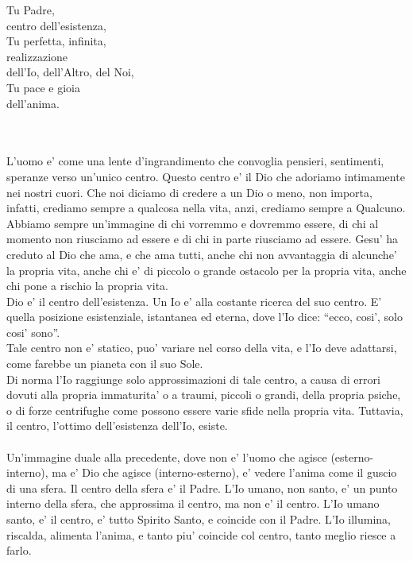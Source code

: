 \begin{vcentered}
\begin{poem}
Tu Padre,\\
centro dell'esistenza,\\
Tu perfetta, infinita, \\
    realizzazione\\
dell'Io, dell'Altro, del Noi,\\
Tu pace e gioia\\
dell'anima.\\
\end{poem}
\leavevmode\\
\leavevmode\\
L'uomo e' come una lente d'ingrandimento che convoglia pensieri, sentimenti, speranze verso un'unico centro. Questo centro e' il Dio che adoriamo intimamente nei nostri cuori. Che noi diciamo di credere a un Dio o meno, non importa, infatti, crediamo sempre a qualcosa nella vita, anzi, crediamo sempre a Qualcuno. Abbiamo sempre un'immagine di chi vorremmo e dovremmo essere, di chi al momento non riusciamo ad essere e di chi in parte riusciamo ad essere. Gesu' ha creduto al Dio che ama, e che ama tutti, anche chi non avvantaggia di alcunche' la propria vita, anche chi e' di piccolo o grande ostacolo per la propria vita, anche chi pone a rischio la propria vita. \\
Dio e' il centro dell'esistenza. Un Io e' alla costante ricerca del suo centro. E' quella posizione esistenziale, istantanea ed eterna, dove l'Io dice: ``ecco, cosi', solo cosi' sono''. \\
Tale centro non e' statico, puo' variare nel corso della vita, e l'Io deve adattarsi, come farebbe un pianeta con il suo Sole.\\
Di norma l'Io raggiunge solo approssimazioni di tale centro, a causa di errori dovuti alla propria immaturita' o a traumi, piccoli o grandi, della propria psiche, o di forze centrifughe come possono essere varie sfide nella propria vita. Tuttavia, il centro, l'ottimo dell'esistenza dell'Io, esiste. \\
\leavevmode\\
Un'immagine duale alla precedente, dove non e' l'uomo che agisce (esterno-interno), ma e' Dio che agisce (interno-esterno), e' vedere l'anima come il guscio di una sfera. Il centro della sfera e' il Padre. L'Io umano, non santo, e' un punto interno della sfera, che approssima il centro, ma non e' il centro. L'Io umano santo, e' il centro, e' tutto Spirito Santo, e coincide con il Padre. L'Io illumina, riscalda, alimenta l'anima, e tanto piu' coincide col centro, tanto meglio riesce a farlo.\\
\end{vcentered}

